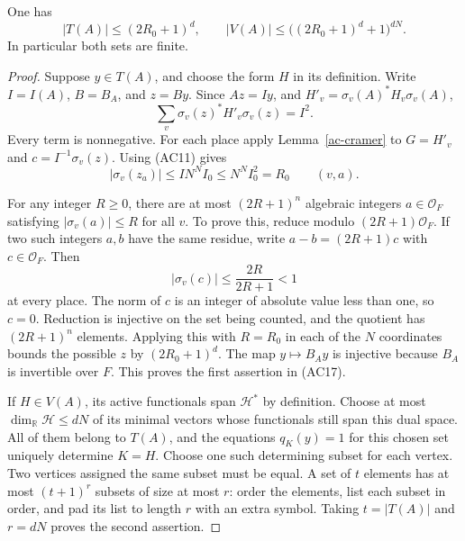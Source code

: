 \begin{lemma}\label{ac-short-count}
One has
\[
             |T(A)|\le(2R_0+1)^d,\qquad
             |V(A)|\le\bigl((2R_0+1)^d+1\bigr)^{dN}.
             \tag{AC17}
\]
In particular both sets are finite.
\end{lemma}
\begin{proof}
Suppose $y\in T(A)$, and choose the form $H$ in its definition.
Write $I=I(A)$, $B=B_A$, and $z=By$.
Since $Az=Iy$, and $H'_v=\sigma_v(A)^*H_v\sigma_v(A)$,
\[
              \sum_v \sigma_v(z)^*H'_v\sigma_v(z)=I^2.
\]
Every term is nonnegative.  For each place apply
Lemma~\ref{ac-cramer} to $G=H'_v$ and
$c=I^{-1}\sigma_v(z)$.  Using (AC11) gives
\[
       |\sigma_v(z_a)|
          \le I N^N I_0
          \le N^N I_0^2=R_0
                  \qquad(v,a).
                  \tag{AC18}
\]

For any integer $R\ge0$, there are at most $(2R+1)^n$
algebraic integers $a\in\mathcal O_F$ satisfying
$|\sigma_v(a)|\le R$ for all $v$.
To prove this, reduce modulo $(2R+1)\mathcal O_F$.
If two such integers $a,b$ have the same residue, write
$a-b=(2R+1)c$ with $c\in\mathcal O_F$.  Then
\[
                    |\sigma_v(c)|\le\frac{2R}{2R+1}<1
\]
at every place.  The norm of $c$ is an integer of absolute
value less than one, so $c=0$.  Reduction is injective on
the set being counted, and the quotient has
$(2R+1)^n$ elements.  Applying this with $R=R_0$ in each
of the $N$ coordinates bounds the possible $z$ by
$(2R_0+1)^d$.  The map $y\mapsto B_Ay$ is injective
because $B_A$ is invertible over $F$.  This proves the
first assertion in (AC17).

If $H\in V(A)$, its active functionals span
$\mathcal H^*$ by definition.  Choose at most
$\dim_{\mathbb R}\mathcal H\le dN$ of its minimal vectors
whose functionals still span this dual space.
All of them belong to $T(A)$, and the equations
$q_K(y)=1$ for this chosen set uniquely determine $K=H$.
Choose one such determining subset for each vertex.
Two vertices assigned the same subset must be equal.
A set of $t$ elements has at most $(t+1)^r$ subsets of
size at most $r$: order the elements, list each subset
in order, and pad its list to length $r$ with an extra
symbol.  Taking $t=|T(A)|$ and $r=dN$ proves the
second assertion.
\end{proof}

